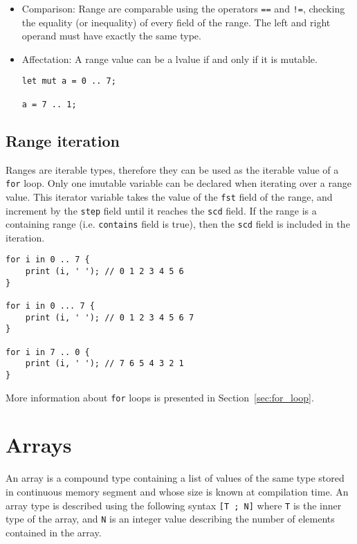 \begin{itemize}
\item Comparison: Range are comparable using the operators \texttt{==} and
  \texttt{!=}, checking the equality (or inequality) of every field of the
  range. The left and right operand must have exactly the same type.

\item Affectation: A range value can be a lvalue if and only if it is mutable.
  \begin{lstlisting}[style=coloredverbatim]
let mut a = 0 .. 7;

a = 7 .. 1;
  \end{lstlisting}

\end{itemize}

\subsection {Range iteration}

Ranges are iterable types, therefore they can be used as the iterable value of a
\texttt{for} loop. Only one imutable variable can be declared when iterating
over a range value. This iterator variable takes the value of the \texttt{fst}
field of the range, and increment by the \texttt{step} field until it reaches
the \texttt{scd} field. If the range is a containing range (i.e.
\texttt{contains} field is true), then the \texttt{scd} field is included in the
iteration.

\begin{lstlisting}[style=coloredverbatim]
for i in 0 .. 7 {
    print (i, ' '); // 0 1 2 3 4 5 6
}

for i in 0 ... 7 {
    print (i, ' '); // 0 1 2 3 4 5 6 7
}

for i in 7 .. 0 {
    print (i, ' '); // 7 6 5 4 3 2 1
}
\end{lstlisting}

More information about \texttt{for} loops is presented in
Section~\ref{sec:for_loop}.

\section{Arrays}

An array is a compound type containing a list of values of the same type stored
in continuous memory segment and whose size is known at compilation time. An
array type is described using the following syntax \texttt{[T ; N]} where
\texttt{T} is the inner type of the array, and \texttt{N} is an integer value
describing the number of elements contained in the array.

